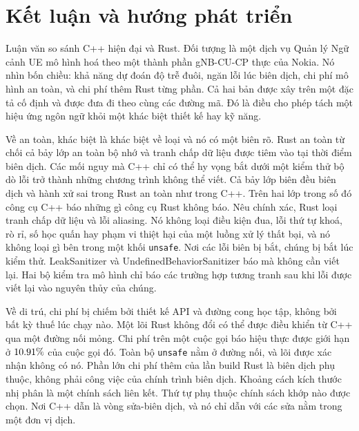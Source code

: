 \chapter{Kết luận và hướng phát triển\label{chapter:conclusions}}

Luận văn so sánh C++ hiện đại và Rust. Đối tượng là một dịch vụ Quản lý Ngữ cảnh UE mô hình hoá
theo một thành phần gNB-CU-CP thực của Nokia. Nó nhìn bốn chiều: khả năng dự đoán độ trễ đuôi,
ngăn lỗi lúc biên dịch, chi phí mô hình an toàn, và chi phí thêm Rust từng phần. Cả hai bản được
xây trên một đặc tả cố định và được đưa đi theo cùng các đường mã. Đó là điều cho phép tách một
hiệu ứng ngôn ngữ khỏi một khác biệt thiết kế hay kỹ năng.

Về an toàn, khác biệt là khác biệt về loại và nó có một biên rõ. Rust an toàn từ chối cả bảy
lớp an toàn bộ nhớ và tranh chấp dữ liệu được tiêm vào tại thời điểm biên dịch. Các mối nguy mà
C++ chỉ có thể hy vọng bắt dưới một kiểm thử bộ dò lỗi trở thành những chương trình không thể
viết. Cả bảy lớp biên đều biên dịch và hành xử sai trong Rust an toàn như trong C++. Trên hai
lớp trong số đó công cụ C++ báo những gì công cụ Rust không báo. Nêu chính xác, Rust loại tranh
chấp dữ liệu và lỗi aliasing. Nó không loại điều kiện đua, lỗi thứ tự khoá, rò rỉ, số học quấn
hay phạm vi thiệt hại của một luồng xử lý thất bại, và nó không loại gì bên trong một khối
\texttt{unsafe}. Nơi các lỗi biên bị bắt, chúng bị bắt lúc kiểm thử. LeakSanitizer và
UndefinedBehaviorSanitizer báo mà không cần viết lại. Hai bộ kiểm tra mô hình chỉ báo các trường
hợp tương tranh sau khi lỗi được viết lại vào nguyên thủy của chúng.

Về di trú, chi phí bị chiếm bởi thiết kế API và đường cong học tập, không bởi bất kỳ thuế lúc
chạy nào. Một lõi Rust không đổi có thể được điều khiển từ C++ qua một đường nối mỏng. Chi phí
trên một cuộc gọi báo hiệu thực được giới hạn ở $10.91\%$ của cuộc gọi đó. Toàn bộ
\texttt{unsafe} nằm ở đường nối, và lõi được xác nhận không có nó. Phần lớn chi phí thêm của lần
build Rust là biên dịch phụ thuộc, không phải công việc của chính trình biên dịch. Khoảng cách
kích thước nhị phân là một chính sách liên kết. Thứ tự phụ thuộc chính sách khớp nào được chọn.
Nơi C++ dẫn là vòng sửa-biên dịch, và nó chỉ dẫn với các sửa nằm trong một đơn vị dịch.

